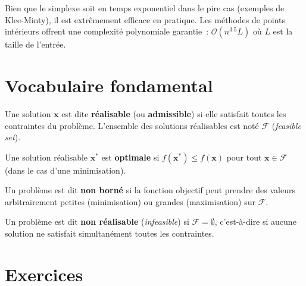 \begin{attention}[title=\textbf{Complexit\'e du simplexe}]
Bien que le simplexe soit en temps exponentiel dans le pire cas (exemples de
Klee-Minty), il est extr\^emement efficace en pratique.  Les m\'ethodes de
points int\'erieurs offrent une complexit\'e polynomiale garantie~:
$\mathcal{O}(n^{3.5} L)$ o\`u $L$ est la taille de l'entr\'ee.
\end{attention}

\section{Vocabulaire fondamental}

\begin{definition}
Une solution $\mathbf{x}$ est dite \textbf{r\'ealisable} (ou \textbf{admissible})
si elle satisfait toutes les contraintes du probl\`eme.
L'ensemble des solutions r\'ealisables est not\'e $\mathcal{F}$ (\textit{feasible set}).
\end{definition}

\begin{definition}
Une solution r\'ealisable $\mathbf{x}^*$ est \textbf{optimale} si
$f(\mathbf{x}^*) \le f(\mathbf{x})$ pour tout $\mathbf{x} \in \mathcal{F}$
(dans le cas d'une minimisation).
\end{definition}

\begin{definition}
Un probl\`eme est dit \textbf{non born\'e} si la fonction objectif peut prendre
des valeurs arbitrairement petites (minimisation) ou grandes (maximisation)
sur $\mathcal{F}$.
\end{definition}

\begin{definition}
Un probl\`eme est dit \textbf{non r\'ealisable} (\textit{infeasible}) si
$\mathcal{F} = \emptyset$, c'est-\`a-dire si aucune solution ne satisfait
simultan\'ement toutes les contraintes.
\end{definition}

\section{Exercices}

